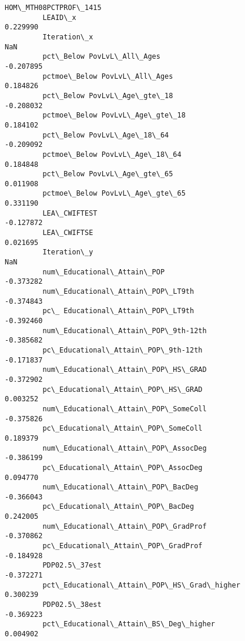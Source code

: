 \documentclass[11pt]{article}
\begin{document}
\begin{Verbatim}[commandchars=\\\{\}]
                                                    HOM\_MTH08PCTPROF\_1415  
         LEAID\_x                                                 0.229990  
         Iteration\_x                                                  NaN  
         pct\_Below PovLvL\_All\_Ages                              -0.207895  
         pctmoe\_Below PovLvL\_All\_Ages                            0.184826  
         pct\_Below PovLvL\_Age\_gte\_18                            -0.208032  
         pctmoe\_Below PovLvL\_Age\_gte\_18                          0.184102  
         pct\_Below PovLvL\_Age\_18\_64                             -0.209092  
         pctmoe\_Below PovLvL\_Age\_18\_64                           0.184848  
         pct\_Below PovLvL\_Age\_gte\_65                             0.011908  
         pctmoe\_Below PovLvL\_Age\_gte\_65                          0.331190  
         LEA\_CWIFTEST                                           -0.127872  
         LEA\_CWIFTSE                                             0.021695  
         Iteration\_y                                                  NaN  
         num\_Educational\_Attain\_POP                             -0.373282  
         num\_Educational\_Attain\_POP\_LT9th                       -0.374843  
         pc\_ Educational\_Attain\_POP\_LT9th                       -0.392460  
         num\_Educational\_Attain\_POP\_9th-12th                    -0.385682  
         pc\_Educational\_Attain\_POP\_9th-12th                     -0.171837  
         num\_Educational\_Attain\_POP\_HS\_GRAD                     -0.372902  
         pc\_Educational\_Attain\_POP\_HS\_GRAD                       0.003252  
         num\_Educational\_Attain\_POP\_SomeColl                    -0.375826  
         pc\_Educational\_Attain\_POP\_SomeColl                      0.189379  
         num\_Educational\_Attain\_POP\_AssocDeg                    -0.386199  
         pc\_Educational\_Attain\_POP\_AssocDeg                      0.094770  
         num\_Educational\_Attain\_POP\_BacDeg                      -0.366043  
         pc\_Educational\_Attain\_POP\_BacDeg                        0.242005  
         num\_Educational\_Attain\_POP\_GradProf                    -0.370862  
         pc\_Educational\_Attain\_POP\_GradProf                     -0.184928  
         PDP02.5\_37est                                          -0.372271  
         pct\_Educational\_Attain\_POP\_HS\_Grad\_higher               0.300239  
         PDP02.5\_38est                                          -0.369223  
         pct\_Educational\_Attain\_BS\_Deg\_higher                    0.004902  

\end{Verbatim}
\end{document}
